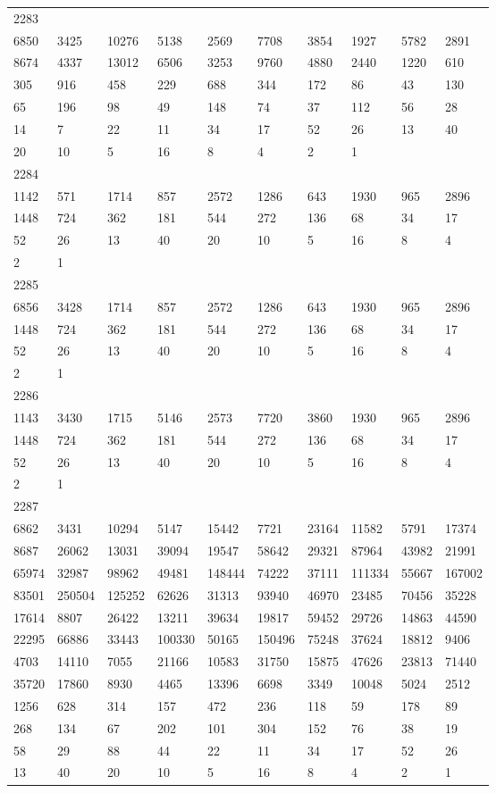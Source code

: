 \begin{longtable}{*{10}{l}}
2283&&&&&&&&&\\
6850& 3425& 10276& 5138& 2569& 7708& 3854& 1927& 5782& 2891\\
8674& 4337& 13012& 6506& 3253& 9760& 4880& 2440& 1220& 610\\
305& 916& 458& 229& 688& 344& 172& 86& 43& 130\\
65& 196& 98& 49& 148& 74& 37& 112& 56& 28\\
14& 7& 22& 11& 34& 17& 52& 26& 13& 40\\
20& 10& 5& 16& 8& 4& 2& 1& \\

2284&&&&&&&&&\\
1142& 571& 1714& 857& 2572& 1286& 643& 1930& 965& 2896\\
1448& 724& 362& 181& 544& 272& 136& 68& 34& 17\\
52& 26& 13& 40& 20& 10& 5& 16& 8& 4\\
2& 1& \\

2285&&&&&&&&&\\
6856& 3428& 1714& 857& 2572& 1286& 643& 1930& 965& 2896\\
1448& 724& 362& 181& 544& 272& 136& 68& 34& 17\\
52& 26& 13& 40& 20& 10& 5& 16& 8& 4\\
2& 1& \\

2286&&&&&&&&&\\
1143& 3430& 1715& 5146& 2573& 7720& 3860& 1930& 965& 2896\\
1448& 724& 362& 181& 544& 272& 136& 68& 34& 17\\
52& 26& 13& 40& 20& 10& 5& 16& 8& 4\\
2& 1& \\

2287&&&&&&&&&\\
6862& 3431& 10294& 5147& 15442& 7721& 23164& 11582& 5791& 17374\\
8687& 26062& 13031& 39094& 19547& 58642& 29321& 87964& 43982& 21991\\
65974& 32987& 98962& 49481& 148444& 74222& 37111& 111334& 55667& 167002\\
83501& 250504& 125252& 62626& 31313& 93940& 46970& 23485& 70456& 35228\\
17614& 8807& 26422& 13211& 39634& 19817& 59452& 29726& 14863& 44590\\
22295& 66886& 33443& 100330& 50165& 150496& 75248& 37624& 18812& 9406\\
4703& 14110& 7055& 21166& 10583& 31750& 15875& 47626& 23813& 71440\\
35720& 17860& 8930& 4465& 13396& 6698& 3349& 10048& 5024& 2512\\
1256& 628& 314& 157& 472& 236& 118& 59& 178& 89\\
268& 134& 67& 202& 101& 304& 152& 76& 38& 19\\
58& 29& 88& 44& 22& 11& 34& 17& 52& 26\\
13& 40& 20& 10& 5& 16& 8& 4& 2& 1\\


\end{longtable}
